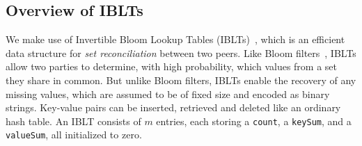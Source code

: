 
 
 \subsection{Overview of IBLTs}
\label{sec:iblts-explained}\label{sec:network-rate}
We make use of Invertible Bloom Lookup Tables (IBLTs)~\cite{goodrich:2011}, which is an efficient data structure  for {\em set reconciliation} between two peers.  Like 
  Bloom filters~\cite{Bloom:1970}, IBLTs allow
  two parties to determine, with high probability, which values from a
  set they share in common.  But unlike Bloom filters, IBLTs enable the
  recovery of any missing values, which are assumed to be of fixed
  size and encoded as binary strings.  Key-value pairs can be
  inserted, retrieved and deleted like an ordinary hash table.  An
  IBLT consists of $m$ entries, each storing a \texttt{count}, a
  \texttt{keySum}, and a \texttt{valueSum}, all initialized to zero. 
  
